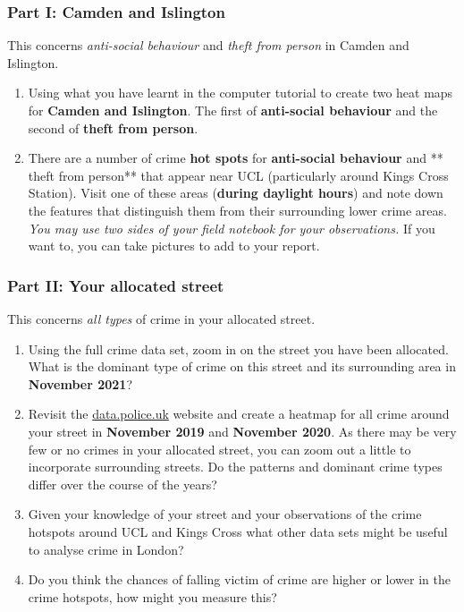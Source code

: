\documentclass[
]{book}
\providecommand{\tightlist}{%
  \setlength{\itemsep}{0pt}\setlength{\parskip}{0pt}}
\begin{document}
\hypertarget{part-i-camden-and-islington}{%
\subsubsection*{Part I: Camden and Islington}\label{part-i-camden-and-islington}}

This concerns \emph{anti-social behaviour} and \emph{theft from person} in Camden and Islington.

\begin{enumerate}
\def\labelenumi{\arabic{enumi}.}
\tightlist
\item
  Using what you have learnt in the computer tutorial to create two heat maps for \textbf{Camden and Islington}. The first of \textbf{anti-social behaviour} and the second of \textbf{theft from person}.
\item
  There are a number of crime \textbf{hot spots} for \textbf{anti-social behaviour} and ** theft from person** that appear near UCL (particularly around Kings Cross Station). Visit one of these areas (\textbf{during daylight hours}) and note down the features that distinguish them from their surrounding lower crime areas. \emph{You may use two sides of your field notebook for your observations.} If you want to, you can take pictures to add to your report.
\end{enumerate}

\hypertarget{part-ii-your-allocated-street}{%
\subsubsection*{Part II: Your allocated street}\label{part-ii-your-allocated-street}}

This concerns \emph{all types} of crime in your allocated street.

\begin{enumerate}
\def\labelenumi{\arabic{enumi}.}
\setcounter{enumi}{2}
\tightlist
\item
  Using the full crime data set, zoom in on the street you have been allocated. What is the dominant type of crime on this street and its surrounding area in \textbf{November 2021}?
\item
  Revisit the \href{https://data.police.uk/}{data.police.uk} website and create a heatmap for all crime around your street in \textbf{November 2019} and \textbf{November 2020}. As there may be very few or no crimes in your allocated street, you can zoom out a little to incorporate surrounding streets. Do the patterns and dominant crime types differ over the course of the years?
\item
  Given your knowledge of your street and your observations of the crime hotspots around UCL and Kings Cross what other data sets might be useful to analyse crime in London?
\item
  Do you think the chances of falling victim of crime are higher or lower in the crime hotspots, how might you measure this?
\end{enumerate}
\end{document}
